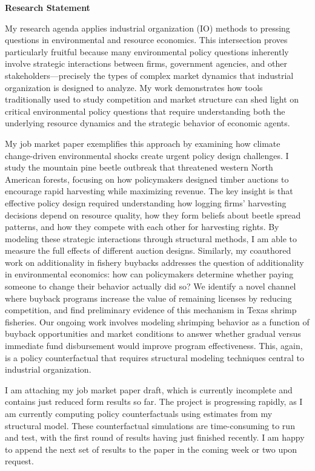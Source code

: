 \documentclass[11pt,letterpaper]{article}
\newenvironment{cvheader}
{\begin{center}\Large}
{\end{center}}
\begin{document}
\begin{cvheader}
{\Huge\textbf{Research Statement}}
\end{cvheader}

\vspace{8pt}

My research agenda applies industrial organization (IO) methods to pressing questions in environmental and resource economics. This intersection proves particularly fruitful because many environmental policy questions inherently involve strategic interactions between firms, government agencies, and other stakeholders—precisely the types of complex market dynamics that industrial organization is designed to analyze. My work demonstrates how tools traditionally used to study competition and market structure can shed light on critical environmental policy questions that require understanding both the underlying resource dynamics and the strategic behavior of economic agents.

My job market paper exemplifies this approach by examining how climate change-driven environmental shocks create urgent policy design challenges. I study the mountain pine beetle outbreak that threatened western North American forests, focusing on how policymakers designed timber auctions to encourage rapid harvesting while maximizing revenue. The key insight is that effective policy design required understanding how logging firms' harvesting decisions depend on resource quality, how they form beliefs about beetle spread patterns, and how they compete with each other for harvesting rights. By modeling these strategic interactions through structural methods, I am able to measure the full effects of different auction designs. Similarly, my coauthored work on additionality in fishery buybacks addresses the question of additionality in environmental economics: how can policymakers determine whether paying someone to change their behavior actually did so? We identify a novel channel where buyback programs increase the value of remaining licenses by reducing competition, and find preliminary evidence of this mechanism in Texas shrimp fisheries. Our ongoing work involves modeling shrimping behavior as a function of buyback opportunities and market conditions to answer whether gradual versus immediate fund disbursement would improve program effectiveness. This, again, is a policy counterfactual that requires structural modeling techniques central to industrial organization.

I am attaching my job market paper draft, which is currently incomplete and contains just reduced form results so far. The project is progressing rapidly, as I am currently computing policy counterfactuals using estimates from my structural model. These counterfactual simulations are time-consuming to run and test, with the first round of results having just finished recently. I am happy to append the next set of results to the paper in the coming week or two upon request.
\end{document}
